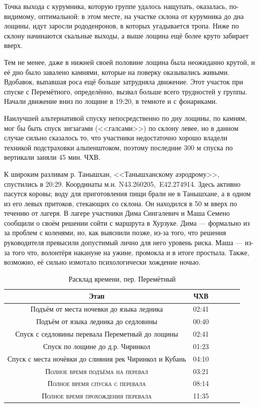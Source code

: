 Точка выхода с курумника, которую группе удалось нащупать, оказалась, по-видимому, оптимальной: в этом месте, на участке склона от курумника до дна лощины, идут заросли рододенронов, в которых угадывается тропа. Ниже по склону начинаются скальные выходы, а выше лощина ещё более круто забирает вверх. 

Тем не менее, даже в нижней своей половине лощина была неожиданно крутой, и её дно было завалено камнями, которые на поверку оказывались живыми. Вдобавок, выпавшая роса ещё больше затрудняла движение. Этот участок при спуске с Перемётного, определённо, вызвал больше всего трудностей у группы. Начали движение вниз по лощине в 19:20, в темноте и с фонариками.

Наилучшей альтернативой спуску непосредственно по дну лощины, по камням, мог бы быть спуск зигзагами (<<галсами>>) по склону левее, но в данном случае сильно сказалось то, что участники недостаточно хорошо владели техникой подстраховки альпенштоком, поэтому последние 300 м спуска по вертикали заняли 45 мин. ЧХВ. 

К широким разливам р. Танышхан, <<Танышханскому аэродрому>>, спустились в 20:29. Координаты м.н. N43.260205\degree,~E42.274914\degree. Здесь активно пасутся коровы; воду для приготовления пищи брали не в Танышхане, а в одном из его левых притоков, стекающих со склона. Он находился в 50 м вверх по течению от лагеря.
В лагере участники Дима Сингалевич и Маша Семено сообщили о своём решении сойти с маршрута в Хурзуке. Дима --- формально из за проблем с коленями, но, как выяснили позже, из-за того, что решения руководителя превысили допустимый лично для него уровень риска. Маша --- из-за того что, волонтёря накануне на ужине, промокла и в итоге простыла. Также, возможно, её сильно измотало психологически хождение ночью.

\begin{table}[h!]
	\centering
	\begin{tabular}{|c|c|c|c|c|c|} 
		\hline 
		Этап & ЧХВ \\ 	
		\hline 
		Подъём от места ночевки до языка ледника  & 02:41 \\
		Подъём от языка ледника до седловины  & 00:40 \\
		Спуск с седловины перевала Переметный до лощины & 02:41\\ 
		Спуск по лощине до д.р. Чиринкол & 01:23\\ 
		Спуск с места ночёвки до слияния рек Чиринкол и Кубань & 04:10 \\
		
		\hline
		\textsc{Полное время подъёма на перевал  }& 03:21\\
		\textsc{Полное время спуска с перевала }& 08:14 \\
		\textsc{Полное время прохождения перевала }& 11:35 \\
		\hline
	\end{tabular}
	\caption{Расклад времени, пер. Перемётный}
\end{table}

